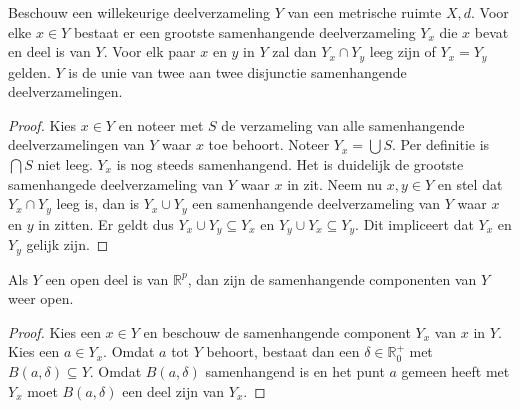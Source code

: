 \documentclass[main.tex]{subfiles}
\begin{document}
\begin{bpr}
  Beschouw een willekeurige deelverzameling $Y$ van een metrische ruimte $X,d$.
  Voor elke $x\in Y$ bestaat er een grootste samenhangende deelverzameling $Y_{x}$ die $x$ bevat en deel is van $Y$.
  Voor elk paar $x$ en $y$ in $Y$ zal dan $Y_{x} \cap Y_{y}$ leeg zijn of $Y_{x} = Y_{y}$ gelden.
  $Y$ is de unie van twee aan twee disjunctie samenhangende deelverzamelingen.

  \begin{proof}
    Kies $x\in Y$ en noteer met $S$ de verzameling van alle samenhangende deelverzamelingen van $Y$ waar $x$ toe behoort.
    Noteer $Y_{x} = \bigcup S$.
    Per definitie is $\bigcap S$ niet leeg.
    $Y_{x}$ is nog steeds samenhangend.
    Het is duidelijk de grootste samenhangede deelverzameling van $Y$ waar $x$ in zit.
    Neem nu $x,y\in Y$ en stel dat $Y_{x}\cap Y_{y}$ leeg is, dan is $Y_{x}\cup Y_{y}$ een samenhangende deelverzameling van $Y$ waar $x$ en $y$ in zitten.
    Er geldt dus $Y_{x} \cup Y_{y} \subseteq Y_{x}$ en $Y_{y} \cup Y_{x} \subseteq Y_{y}$.
    Dit impliceert dat $Y_{x}$ en $Y_{y}$ gelijk zijn.
  \end{proof}
\end{bpr}

\begin{bpr}
 Als $Y$ een open deel is van $\mathbb{R}^{p}$, dan zijn de samenhangende componenten van $Y$ weer open.


 \begin{proof}
   Kies een $x\in Y$ en beschouw de samenhangende component $Y_{x}$ van $x$ in $Y$.
   Kies een $a\in Y_{x}$.
   Omdat $a$ tot $Y$ behoort, bestaat dan een $\delta \in \mathbb{R}_{0}^{+}$ met $B(a,\delta) \subseteq Y$.
   Omdat $B(a,\delta)$ samenhangend is en het punt $a$ gemeen heeft met $Y_{x}$ moet $B(a,\delta)$ een deel zijn van $Y_{x}$.
 \end{proof}
\end{bpr}
\end{document}
